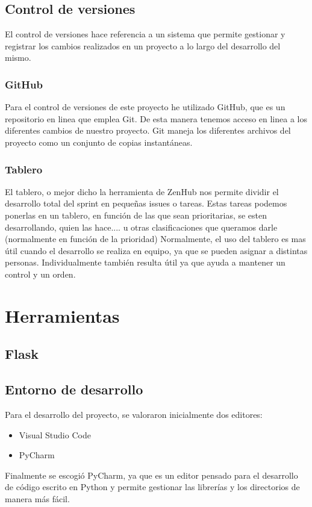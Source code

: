 \subsection{Control de versiones}
El control de versiones hace referencia a un sistema que permite gestionar y registrar los cambios realizados en un proyecto a lo largo del desarrollo del mismo.

\subsubsection{GitHub}
Para el control de versiones de este proyecto he utilizado GitHub, que es un repositorio en linea que emplea Git. De esta manera tenemos acceso en linea a los diferentes cambios de nuestro proyecto.
Git maneja los diferentes archivos del proyecto como un conjunto de copias instantáneas. 

\subsubsection{Tablero}
El tablero, o mejor dicho la herramienta de ZenHub nos permite dividir el desarrollo total del sprint en pequeñas issues o tareas. Estas tareas podemos ponerlas en un tablero, en función de las que sean prioritarias, se esten desarrollando, quien las hace.... u otras clasificaciones que queramos darle (normalmente en función de la prioridad)
Normalmente, el uso del tablero es mas útil cuando el desarrollo se realiza en equipo, ya que se pueden asignar a distintas personas. Individualmente también resulta útil ya que ayuda a mantener un control y un orden.

\section{Herramientas}

\subsection{Flask}

\subsection{Entorno de desarrollo}
Para el desarrollo del proyecto, se valoraron inicialmente dos editores:
\begin{itemize}
	\item Visual Studio Code
	\item PyCharm
\end{itemize}
Finalmente se escogió PyCharm, ya que es un editor pensado para el desarrollo de código escrito en Python y permite gestionar las librerías y los directorios de manera más fácil.

